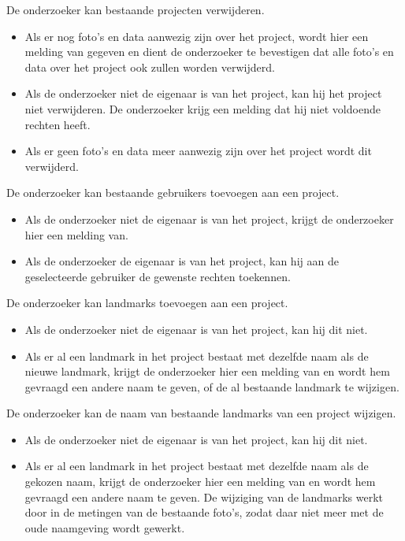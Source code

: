 \noindent
De onderzoeker kan bestaande projecten verwijderen.
\begin{itemize}
	\item Als er nog foto's en data aanwezig zijn over het project, wordt hier een melding van gegeven en dient de onderzoeker te bevestigen dat alle foto's en data over het project ook zullen worden verwijderd.
	\item Als de onderzoeker niet de eigenaar is van het project, kan hij het project niet verwijderen. De onderzoeker krijg een melding dat hij niet voldoende rechten heeft.
	\item Als er geen foto's en data meer aanwezig zijn over het project wordt dit verwijderd.
\end{itemize}

\noindent
De onderzoeker kan bestaande gebruikers toevoegen aan een project.
\begin{itemize}
	\item Als de onderzoeker niet de eigenaar is van het project, krijgt de onderzoeker hier een melding van.
	\item Als de onderzoeker de eigenaar is van het project, kan hij aan de geselecteerde gebruiker de gewenste rechten toekennen.
\end{itemize}

\noindent
De onderzoeker kan landmarks toevoegen aan een project.
\begin{itemize}
	\item Als de onderzoeker niet de eigenaar is van het project, kan hij dit niet.
	\item Als er al een landmark in het project bestaat met dezelfde naam als de nieuwe landmark, krijgt de onderzoeker hier een melding van en wordt hem gevraagd een andere naam te geven, of de al bestaande landmark te wijzigen.
\end{itemize}

\noindent
De onderzoeker kan de naam van bestaande landmarks van een project wijzigen.
\begin{itemize}
	\item Als de onderzoeker niet de eigenaar is van het project, kan hij dit niet.
	\item Als er al een landmark in het project bestaat met dezelfde naam als de gekozen naam, krijgt de onderzoeker hier een melding van en wordt hem gevraagd een andere naam te geven. De wijziging van de landmarks werkt door in de metingen van de bestaande foto's, zodat daar niet meer met de oude naamgeving wordt gewerkt.
\end{itemize}

